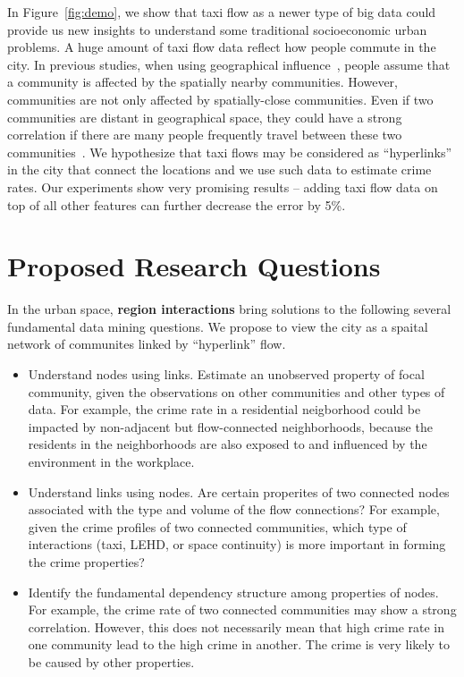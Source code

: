 In Figure~\ref{fig:demo}, we show that taxi flow as a newer type of big data could provide us new insights to understand some traditional socioeconomic urban problems.  A huge amount of taxi flow data reflect how people commute in the city. In previous studies, when using geographical influence~\cite{Ans02}, people assume that a community is affected by the spatially nearby communities. However, communities are not only affected by spatially-close communities. Even if two communities are distant in geographical space, they could have a strong correlation if there are many people frequently travel between these two communities~\cite{GGM14}. We hypothesize that taxi flows may be considered as ``hyperlinks'' in the city that connect the locations and we use such data to estimate crime rates. Our experiments show very promising results --  adding taxi flow data on top of all other features can further decrease the error by 5\%.










\section{Proposed Research Questions}



In the urban space, \textbf{region interactions} bring solutions to the following several fundamental data mining questions. We propose to view the city as a spaital network of communites linked by ``hyperlink'' flow.
\begin{itemize}
\item Understand nodes using links. Estimate an unobserved property of focal community, given the observations on other communities and other types of data. For example, the crime rate in a residential neigborhood could be impacted by  non-adjacent but flow-connected neighborhoods, because the residents in the neighborhoods are also exposed to and influenced by the environment in the workplace.
\item Understand links using nodes. Are certain properites of two connected nodes associated with the type and volume of the flow connections? For example, given the crime profiles of two connected communities, which type of interactions (taxi, LEHD, or space continuity) is more important in forming the crime properties?
\item Identify the fundamental dependency structure among properties of nodes. For example, the crime rate of two connected communities may show a strong correlation. However, this does not necessarily mean that high crime rate in one community lead to the high crime in another. The crime is very likely to be caused by other properties. 
\end{itemize}